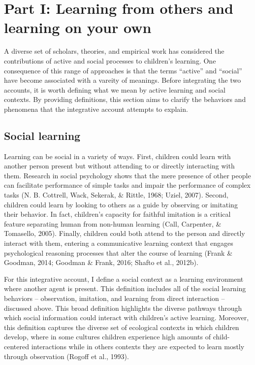 \documentclass[oneside]{report}
\begin{document}
\hypertarget{scope}{\section{Part I: Learning from others and learning
on your own}\label{scope}}

A diverse set of scholars, theories, and empirical work has considered
the contributions of active and social processes to children's learning.
One consequence of this range of approaches is that the terms ``active''
and ``social'' have become associated with a vareity of meanings. Before
integrating the two accounts, it is worth defining what we mean by
active learning and social contexts. By providing definitions, this
section aims to clarify the behaviors and phenomena that the integrative
account attempts to explain.

\subsection{Social learning}\label{social-learning}

Learning can be social in a variety of ways. First, children could learn
with another person present but without attending to or directly
interacting with them. Research in social psychology shows that the mere
presence of other people can facilitate performance of simple tasks and
impair the performance of complex tasks (N. B. Cottrell, Wack, Sekerak,
\& Rittle, 1968; Uziel, 2007). Second, children could learn by looking
to others as a guide by observing or imitating their behavior. In fact,
children's capacity for faithful imitation is a critical feature
separating human from non-human learning (Call, Carpenter, \& Tomasello,
2005). Finally, children could both attend to the person and directly
interact with them, entering a communicative learning context that
engages psychological reasoning processes that alter the course of
learning (Frank \& Goodman, 2014; Goodman \& Frank, 2016; Shafto et al.,
2012b).

For this integrative account, I define a social context as a learning
environment where another agent is present. This definition includes all
of the social learning behaviors -- observation, imitation, and learning
from direct interaction -- discussed above. This broad definition
highlights the diverse pathways through which social information could
interact with children's active learning. Moreover, this definition
captures the diverse set of ecological contexts in which children
develop, where in some cultures children experience high amounts of
child-centered interactions while in others contexts they are expected
to learn mostly through observation (Rogoff et al., 1993).
\end{document}
